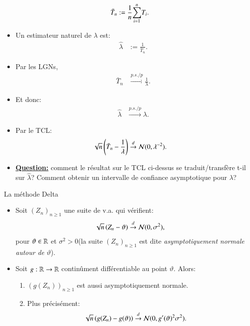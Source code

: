 \begin{frame}
\begin{itemize}
                \begin{align*}
                    \bar{T}_n &:=\frac{1}{n}{\sum_{i=1}^n} T_i.
                \end{align*}   
                \item Un estimateur naturel de $\lambda$ est: 
                \begin{align*}
                    \hat{\lambda} &:=\frac{1}{\bar{T}_n}.
                \end{align*} 
                \framebreak
                \item Par les LGNs,
                \begin{align*}
                    \bar{T}_n &\overset{p.s./p}{\longrightarrow} \frac{1}{\lambda}.
                \end{align*}   
                \item Et donc: 
                \begin{align*}
                    \hat{\lambda}&\overset{p.s./p}{\longrightarrow} \lambda.
                \end{align*}     
                \item Par le TCL: 
                \begin{align*}
                    \sqrt{n}\left(\bar{T}_n - \frac{1}{\lambda}\right)&\overset{d}{\rightarrow} \mathcal{N}(0, \lambda^{-2}).
                \end{align*}                               
                \item \textbf{\underline{Question:}} comment le résultat sur le TCL ci-dessus se traduit/transfère t-il 
                sur $\hat{\lambda}$? Comment obtenir un intervalle de confiance asymptotique pour $\lambda$?
            \end{itemize}
        \end{frame}
\begin{frame}
    [allowframebreaks]{La méthode Delta}
    \begin{itemize}
        \item Soit $(Z_n)_{n\geq 1}$ une suite de v.a. qui vérifient: 
        \begin{align*}
            \sqrt{n}\left(Z_n - \vartheta \right)&\overset{d}{\rightarrow} \mathcal{N}(0, \sigma^2),
        \end{align*}
        pour $\vartheta \in \mathbb{R}$ et $\sigma^2 >0$(la suite $(Z_n)_{n\geq 1}$ est dite \emph{asymptotiquement normale autour de $\vartheta$}).
        \item Soit $g: \mathbb{R} \rightarrow \mathbb{R}$ continûment différentiable au point $\vartheta$. Alors: 
        \begin{enumerate}[-]
            \item $\left(g(Z_n)\right)_{n\geq 1}$ est aussi asymptotiquement normale.
            \item Plus précisément: 
            \begin{align*}
                \sqrt{n}\left(g(Z_n)-g(\vartheta)\right)&\overset{d}{\rightarrow} \mathcal{N}(0, g^\prime(\vartheta)^2\sigma^2).
            \end{align*}
        \end{enumerate}
    \end{itemize}
\end{frame}
